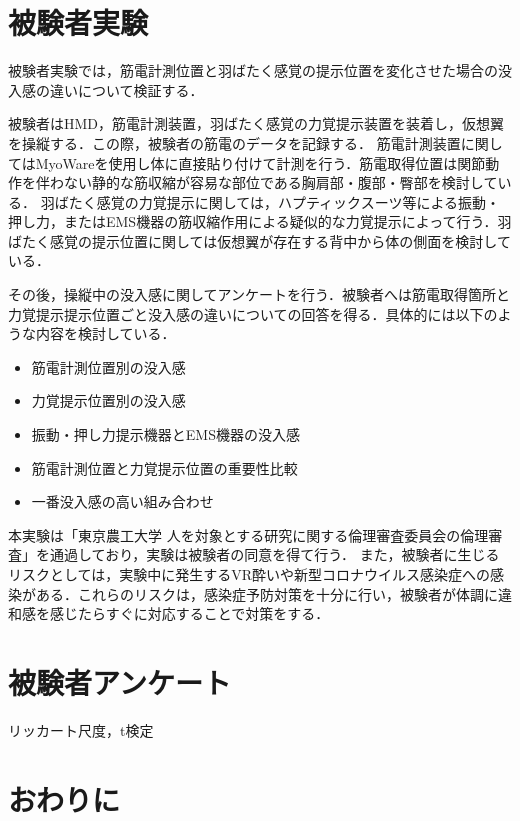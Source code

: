 \section{被験者実験}
    
    被験者実験では，筋電計測位置と羽ばたく感覚の提示位置を変化させた場合の没入感の違いについて検証する．
    
    被験者はHMD，筋電計測装置，羽ばたく感覚の力覚提示装置を装着し，仮想翼を操縦する．この際，被験者の筋電のデータを記録する．
    筋電計測装置に関してはMyoWareを使用し体に直接貼り付けて計測を行う．筋電取得位置は関節動作を伴わない静的な筋収縮が容易な部位である胸肩部・腹部・臀部を検討している．
    羽ばたく感覚の力覚提示に関しては，ハプティックスーツ等による振動・押し力，またはEMS機器の筋収縮作用による疑似的な力覚提示によって行う．羽ばたく感覚の提示位置に関しては仮想翼が存在する背中から体の側面を検討している．
    
    その後，操縦中の没入感に関してアンケートを行う．被験者へは筋電取得箇所と力覚提示提示位置ごと没入感の違いについての回答を得る．具体的には以下のような内容を検討している．
    \begin{itemize}
    \item 筋電計測位置別の没入感
    \item 力覚提示位置別の没入感
    \item 振動・押し力提示機器とEMS機器の没入感
    \item 筋電計測位置と力覚提示位置の重要性比較
    \item 一番没入感の高い組み合わせ
    \end{itemize}

    
    本実験は「東京農工大学 人を対象とする研究に関する倫理審査委員会の倫理審査」を通過しており，実験は被験者の同意を得て行う．
    また，被験者に生じるリスクとしては，実験中に発生するVR酔いや新型コロナウイルス感染症への感染がある．これらのリスクは，感染症予防対策を十分に行い，被験者が体調に違和感を感じたらすぐに対応することで対策をする．
    
    
\section{被験者アンケート}
リッカート尺度，t検定


\section{おわりに}